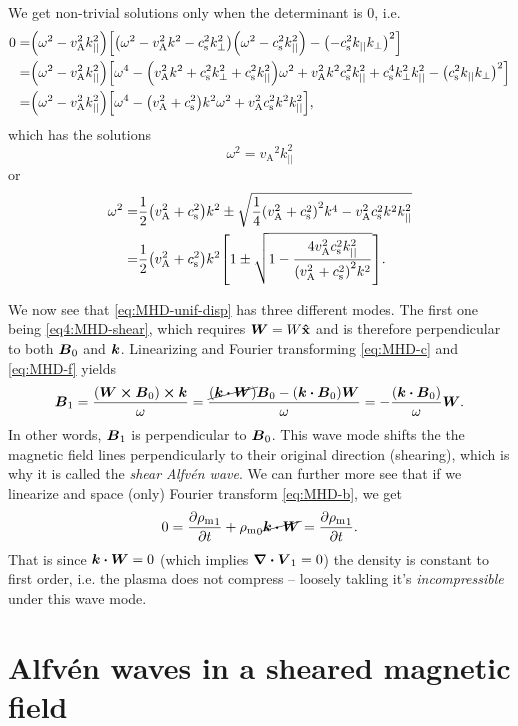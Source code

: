 \documentclass[11pt,a4paper, 
swedish, english %
]{article}
\newcommand{\rhom}{\ensuremath{{\rho_{\text{m}}}}}
\newcommand{\vA}{\ensuremath{v_{\text{A}}}}
\newcommand{\cs}{\ensuremath{c_{\text{s}}}}
\begin{document}
We get non-trivial solutions only when the determinant is 0, i.e.
\begin{equation}
\begin{aligned}
0=&\qty(\omega^2-\vA^2k_{||}^2)\qty[
\qty(\omega^2-\vA^2k^2-\cs^2k_\perp^2)\qty(\omega^2 -\cs^2k_{||}^2)
-\qty(-\cs^2k_{||}k_\perp)^2]\\
=&\qty(\omega^2-\vA^2k_{||}^2)\qty[\omega^4-
\qty(\vA^2k^2+\cs^2k_\perp^2+\cs^2k_{||}^2)\omega^2
+\vA^2k^2\cs^2k_{||}^2
+\cs^4k_\perp^2k_{||}^2-\qty(\cs^2k_{||}k_\perp)^2]\\
=&\qty(\omega^2-\vA^2k_{||}^2)\qty[
\omega^4-\qty(\vA^2+\cs^2)k^2\omega^2
+\vA^2\cs^2k^2k_{||}^2],
\end{aligned}
\end{equation}
which has the solutions
\begin{equation}\label{eq4:MHD-shear}
\omega^2=\vA^2k_{||}^2
\end{equation}
or
\begin{equation}
\begin{aligned}
\omega^2=&\frac{1}{2}\qty(\vA^2+\cs^2)k^2
\pm\sqrt{\frac{1}{4}\qty(\vA^2+\cs^2)^2k^4
-\vA^2\cs^2k^2k_{||}^2}\\
=&\frac{1}{2}\qty(\vA^2+\cs^2)k^2\qty[
1\pm\sqrt{1-\frac{4\vA^2\cs^2k_{||}^2}{\qty(\vA^2+\cs^2)^2k^2}}].
\end{aligned}
\end{equation}

We now see that \eqref{eq:MHD-unif-disp} has three different
modes. The first one being \eqref{eq4:MHD-shear}, which requires
$\vb*W=W\vu{x}$ and is therefore perpendicular to both $\vb*B_0$ and
$\vb*k$. Linearizing and Fourier transforming \eqref{eq:MHD-c} and
\eqref{eq:MHD-f} yields
\begin{equation}
\vb*B_1 = \frac{(\vb*W\cross\vb*B_0)\cross\vb*k}{\omega}
=\frac{\cancel{(\vb*k\vdot\vb*W)}\vb*B_0
-(\vb*k\vdot\vb*B_0)\vb*W}{\omega}
=-\frac{(\vb*k\vdot\vb*B_0)}{\omega}\vb*W.
\end{equation}
In other words, $\vb*B_1$ is perpendicular to $\vb*B_0$. This wave
mode shifts the the magnetic field lines perpendicularly to their
original direction (shearing), which is why it is called the
\emph{shear Alfvén wave}. We can further more see that if we
linearize and space (only) Fourier transform \eqref{eq:MHD-b}, we get 
\begin{equation}
0=\pdv{\rhom_1}{t} + \rhom_0\cancel{\vb*k\vdot\vb*W}
=\pdv{\rhom_1}{t}.
\end{equation}
That is since $\vb*k\vdot\vb*W=0$ (which implies $\div\vb*V_1=0$) the
density is constant to first order, i.e. the plasma does not compress
-- loosely takling it's \emph{incompressible} under this wave mode.



\section{Alfvén waves in a sheared magnetic field}




\end{document}
